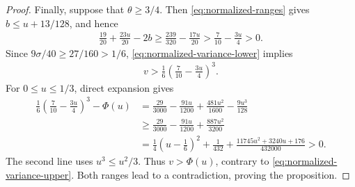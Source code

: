 \begin{proof}
Finally, suppose that $\theta\ge3/4$.
Then \cref{eq:normalized-ranges} gives $b\le u+13/128$, and hence
\begin{align*}
 \frac{19}{20}+\frac{23u}{20}-2b
 \ge\frac{239}{320}-\frac{17u}{20}
 >\frac7{10}-\frac{3u}{4}>0.
\end{align*}
Since $9\sigma/40\ge27/160>1/6$, \cref{eq:normalized-variance-lower} implies
\begin{align*}
 v>\frac16\left(\frac7{10}-\frac{3u}{4}\right)^3.
\end{align*}
For $0\le u\le1/3$, direct expansion gives
\begin{align*}
 \frac16\left(\frac7{10}-\frac{3u}{4}\right)^3-\Phi(u)
 &=\frac{29}{3000}-\frac{91u}{1200}
   +\frac{481u^2}{1600}-\frac{9u^3}{128}\\
 &\ge\frac{29}{3000}-\frac{91u}{1200}+\frac{887u^2}{3200}\\
 &=\frac14\left(u-\frac16\right)^2+\frac1{432}
   +\frac{11745u^2+3240u+176}{432000}
 >0.
\end{align*}
The second line uses $u^3\le u^2/3$.
Thus $v>\Phi(u)$, contrary to \cref{eq:normalized-variance-upper}.
Both ranges lead to a contradiction, proving the proposition.
\end{proof}
